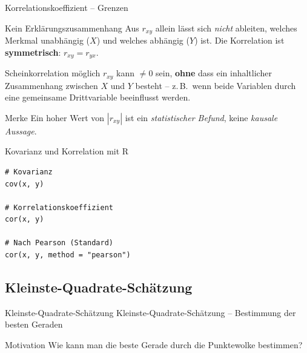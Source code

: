 \documentclass[aspectratio=169,11pt]{beamer}
\begin{document}
\begin{frame}{Korrelationskoeffizient -- Grenzen}
  \begin{alertblock}{Kein Erklärungszusammenhang}
    Aus $r_{xy}$ allein lässt sich \emph{nicht} ableiten, welches
    Merkmal unabhängig ($X$) und welches abhängig ($Y$) ist.
    Die Korrelation ist \textbf{symmetrisch}: $r_{xy} = r_{yx}$.
  \end{alertblock}

  \medskip

  \begin{alertblock}{Scheinkorrelation möglich}
    $r_{xy}$ kann $\ne 0$ sein, \textbf{ohne} dass ein inhaltlicher
    Zusammenhang zwischen $X$ und $Y$ besteht -- z.\,B.\ wenn beide
    Variablen durch eine gemeinsame Drittvariable beeinflusst werden.
  \end{alertblock}

  \medskip

  \begin{block}{Merke}
    Ein hoher Wert von $|r_{xy}|$ ist ein \emph{statistischer Befund},
    keine \emph{kausale Aussage}. 
  \end{block}
\end{frame}



\begin{frame}[fragile]{Kovarianz und Korrelation mit R}
\begin{lstlisting}
# Kovarianz
cov(x, y)

# Korrelationskoeffizient
cor(x, y)

# Nach Pearson (Standard)
cor(x, y, method = "pearson")
\end{lstlisting}
\end{frame}



\subsection{Kleinste-Quadrate-Schätzung}

\begin{frame}{Kleinste-Quadrate-Schätzung}
  Kleinste-Quadrate-Schätzung -- Bestimmung der besten Geraden
\end{frame}

\begin{frame}{Motivation}
  Wie kann man die beste Gerade durch die Punktewolke bestimmen?
\end{frame}
\end{document}

